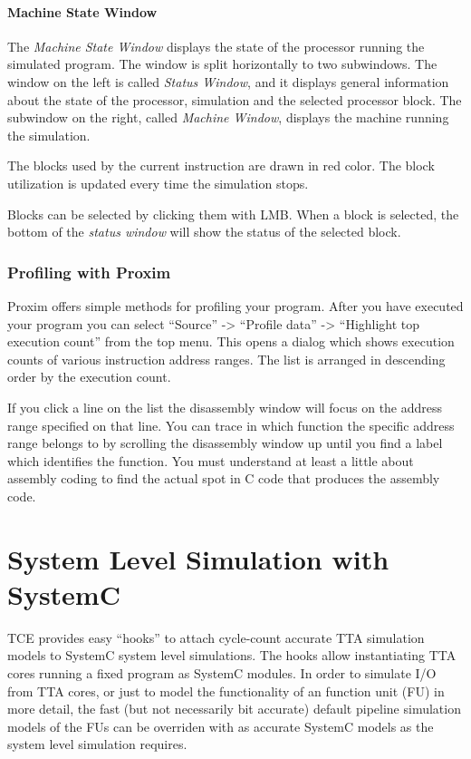 \documentclass[a4paper,twoside]{tceusermanual}
\begin{document}
\paragraph{Machine State Window}

The \emph{Machine State Window}
displays the state of the processor running the simulated program.
The window is split horizontally to two subwindows. The window on the
left is called \emph{Status Window}, and it displays general information
about the state of the processor, simulation and the selected processor
block. The subwindow on the right, called \emph{Machine Window},
displays the machine running the simulation.

The blocks used by the current instruction are drawn in red color. The block
utilization is updated every time the simulation stops.

Blocks can be selected by clicking them with LMB.
When a block is selected, the bottom of the \emph{status window}
will show the status of the selected block.

\subsubsection{Profiling with Proxim}
\label{sec:ProfileProxim}

Proxim offers simple methods for profiling your program. After you have
executed your program you can select ``Source'' -> ``Profile data'' ->
``Highlight top execution count'' from the top menu. This opens a dialog which
shows execution counts of various instruction address ranges. The list is
arranged in descending order by the execution count.

If you click a line on the list the disassembly window will focus on the
address range specified on that line. You can trace in which function the
specific address range belongs to by scrolling the disassembly window up
until you find a label which identifies the function. You must understand at
least a little about assembly coding to find the actual spot in C code that
produces the assembly code.

\section{System Level Simulation with SystemC}
\label{sec:SystemC}

TCE provides easy ``hooks'' to attach cycle-count accurate TTA
simulation models to SystemC system level simulations. The hooks allow 
instantiating TTA cores running a fixed program as SystemC modules. 
In order to simulate I/O from TTA cores, or just to model the functionality 
of an function unit (FU) in more detail, the fast (but not necessarily
bit accurate) default pipeline simulation models of the FUs can be 
overriden with as accurate SystemC models as the system level simulation
requires. 
\end{document}
